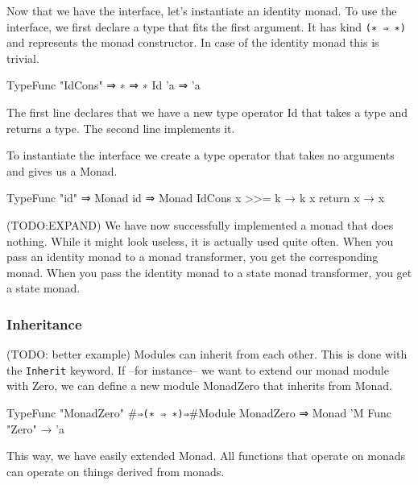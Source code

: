   Now that we have the interface, let's instantiate an identity monad.
  To use the interface, we first declare a type that fits the first argument.
  It has kind \verb|(∗ ⇒ ∗)| and represents the monad constructor.
  In case of the identity monad this is trivial.

  \begin{code}
  TypeFunc "IdCons" ⇒ ∗ ⇒ ∗
  Id 'a ⇒ 'a
  \end{code}

  The first line declares that we have a new type operator Id that takes a type and returns a type.
  The second line implements it. 

  To instantiate the interface we create a type operator that takes no arguments and gives us a Monad.
  
  \begin{code}
  TypeFunc "id" ⇒ Monad 
  id ⇒ Monad IdCons {
    x >>= k → k x
    return x → x
  }
  \end{code}

  (TODO:EXPAND)
  We have now successfully implemented a monad that does nothing.
  While it might look useless, it is actually used quite often.
  When you pass an identity monad to a monad transformer, you get the corresponding monad.
  When you pass the identity monad to a state monad transformer, you get a state monad.

  \subsubsection*{Inheritance}
  (TODO: better example)
  Modules can inherit from each other.
  This is done with the \verb|Inherit| keyword. 
  If --for instance-- we want to extend our monad module with Zero,
  we can define a new module MonadZero that inherits from Monad.

  \begin{code}
  TypeFunc "MonadZero" #\verb|⇒(∗ ⇒ ∗)⇒|#Module
  MonadZero ⇒ Monad 'M {
    Func "Zero" → 'a
  }
  \end{code}

  This way, we have easily extended Monad.
  All functions that operate on monads can operate on things derived from monads.
